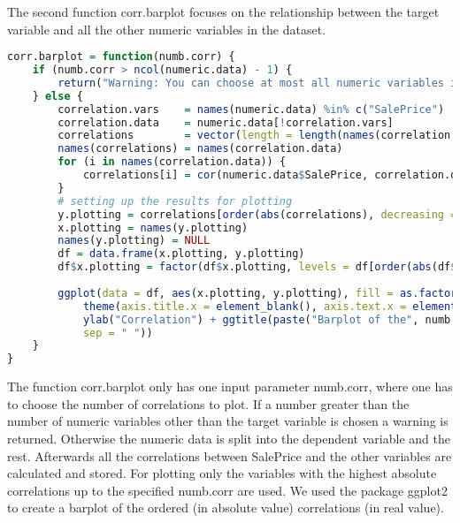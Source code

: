 The second function corr.barplot focuses on the relationship between the target variable and all the other numeric variables in the dataset. 
\begin{lstlisting}[language=R]
corr.barplot = function(numb.corr) {
    if (numb.corr > ncol(numeric.data) - 1) {
        return("Warning: You can choose at most all numeric variables in the dataset except the target variable SalePrice, which is already implemented as default value")
    } else {
        correlation.vars    = names(numeric.data) %in% c("SalePrice")
        correlation.data    = numeric.data[!correlation.vars]                  # subsetting the numeric variables to not contain the target variable
        correlations        = vector(length = length(names(correlation.data))) # setting up vector for results (correlations)
        names(correlations) = names(correlation.data)
        for (i in names(correlation.data)) {                                   # calculating all bivariate correlations
            correlations[i] = cor(numeric.data$SalePrice, correlation.data[i], use = "pairwise.complete.obs")
        }
        # setting up the results for plotting
        y.plotting = correlations[order(abs(correlations), decreasing = TRUE)][1:numb.corr]
        x.plotting = names(y.plotting)
        names(y.plotting) = NULL
        df = data.frame(x.plotting, y.plotting)
        df$x.plotting = factor(df$x.plotting, levels = df[order(abs(df$y.plotting), decreasing = TRUE), "x.plotting"])
        
        ggplot(data = df, aes(x.plotting, y.plotting), fill = as.factor(x.plotting)) + geom_bar(stat = "identity") + 
            theme(axis.title.x = element_blank(), axis.text.x = element_text(angle = 90, vjust = 0.5, size = 12)) + 
            ylab("Correlation") + ggtitle(paste("Barplot of the", numb.corr, "highest bivariate correlations with SalePrice", 
            sep = " "))
    }
}
\end{lstlisting}
The function corr.barplot only has one input parameter numb.corr, where one has to choose the number of correlations to plot. If a number greater than the number of numeric variables other than the target variable is chosen a warning  is returned. Otherwise the numeric data is split into the dependent variable and the rest. Afterwards all the correlations between SalePrice and the other variables are calculated and stored. For plotting only the variables with the highest absolute correlations up to the specified numb.corr are used. We used the package ggplot2 to create a barplot of the ordered (in absolute value) correlations (in real value). 